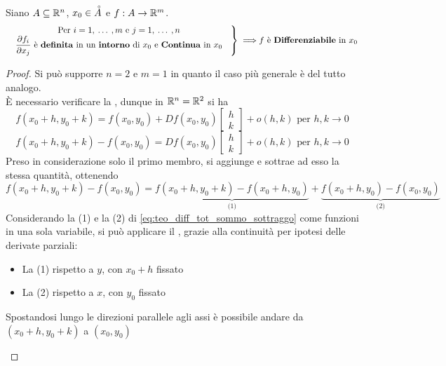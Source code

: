 \begin{theorem}
	\label{teo:diff_tot}
	Siano $A \subseteq \mathbb{R}^n$, $x_0 \in \accentset{\circ}{A}$ e $f:A \to \mathbb{R}^m$.
	\[
		\left.
		\text{
			\begin{tabular}{c}
				Per $i = 1,\:\dotsc\:,m$ e $j = 1,\:\dotsc\:,n$\\
				$\frac{\partial f_i}{\partial x_j}$ è \textbf{definita} in un \textbf{intorno} di $x_0$ e \textbf{Continua} in $x_0$
			\end{tabular}
		}
		\right\}
		\implies\\
		f \text{ è \textbf{Differenziabile} in } x_0
	\]
	\begin{proof}
		Si può supporre $n = 2$ e $m = 1$ in quanto il caso più generale è del tutto analogo.\\
		È necessario verificare la , dunque in $\mathbb{R}^n = \mathbb{R}^2$ si ha
		\begin{equation}
			\label{eq:deriv_tot_def_diff}
			f(x_0 + h, y_0 + k) = f(x_0, y_0) + Df(x_0, y_0) \begin{bmatrix}h\\k\end{bmatrix} + o(h,k) \text{ per } h,k \to 0
		\end{equation}
		\[f(x_0 + h, y_0 + k) - f(x_0, y_0) = Df(x_0, y_0) \begin{bmatrix}h\\k\end{bmatrix} + o(h,k) \text{ per } h,k \to 0\]
		Preso in considerazione solo il primo membro, si aggiunge e sottrae ad esso la stessa quantità, ottenendo
		\begin{equation}
			\label{eq:teo_diff_tot_sommo_sottraggo}
			f(x_0 + h, y_0 + k) - f(x_0, y_0) = \underbrace{f(x_0 + h, y_0 + k) - f(x_0+h,y_0)}_{\text{(1)}} + \underbrace{f(x_0+h,y_0) - f(x_0, y_0)}_{\text{(2)}}
		\end{equation}
		Considerando la (1) e la (2) di \cref{eq:teo_diff_tot_sommo_sottraggo} come funzioni in una sola variabile, si può applicare il , grazie alla continuità per ipotesi delle derivate parziali:
		\begin{itemize}
			\item La (1) rispetto a $y$, con $x_0 + h$ fissato
			\item La (2) rispetto a $x$, con $y_0$ fissato
		\end{itemize}
		Spostandosi lungo le direzioni parallele agli assi è possibile andare da $(x_0 + h, y_0 + k)$ a $(x_0, y_0)$
		\begin{center}
\end{center}
\end{proof}
\end{theorem}
